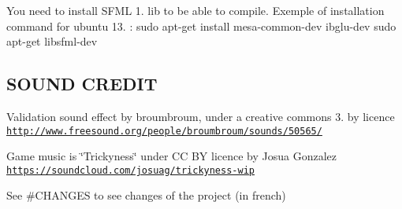 You need to install S\-F\-M\-L 1. lib to be able to compile. Exemple of installation command for ubuntu 13. \-: sudo apt-\/get install mesa-\/common-\/dev ibglu-\/dev sudo apt-\/get libsfml-\/dev

\subsection*{S\-O\-U\-N\-D C\-R\-E\-D\-I\-T }

Validation sound effect by broumbroum, under a creative commons 3. by licence \href{http://www.freesound.org/people/broumbroum/sounds/50565/}{\tt http\-://www.\-freesound.\-org/people/broumbroum/sounds/50565/}

Game music is \char`\"{}\-Trickyness\char`\"{} under C\-C B\-Y licence by Josua Gonzalez \href{https://soundcloud.com/josuag/trickyness-wip}{\tt https\-://soundcloud.\-com/josuag/trickyness-\/wip}

See \#\-C\-H\-A\-N\-G\-E\-S to see changes of the project (in french) 